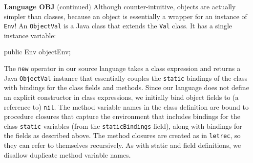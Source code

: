 \begin{minipage}[t]{\sw}
\slidenumber
\LARGE
{\bf Language OBJ} (continued)\exx
Although counter-intuitive,
objects are actually simpler than classes,
because an object is essentially a wrapper
for an instance of \verb'Env'!\exx
An \verb'ObjectVal' is a Java class
that extends the \verb'Val' class.
It has a single instance variable:
\begin{qv}
    public Env objectEnv;
\end{qv}
The \verb'new' operator in our source language
takes a class expression and returns
a Java \verb'ObjectVal' instance
that essentially couples the \verb'static' bindings of the class
with bindings for the class fields and methods.\exx
Since our language does not define
an explicit constructor in class expressions,
we initially bind object fields to (a reference to) \verb'nil'.\exx
The method variable names in the class definition are bound
to procedure closures that capture the environment
that includes bindings for the class \verb'static' variables
(from the \verb'staticBindings' field), 
along with bindings for the fields as described above.
The method closures are created as in \verb'letrec',
so they can refer to themselves recursively.
As with static and field definitions,
we disallow duplicate method variable names.
\end{minipage}

